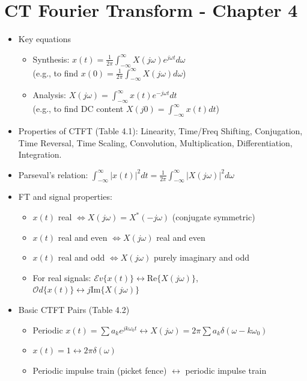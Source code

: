 \documentclass[10pt, twocolumn]{article}
\newcommand{\Ev}{\mathcal{E}v}
\newcommand{\Od}{\mathcal{O}d}
\begin{document}
\section{CT Fourier Transform - Chapter 4}
\begin{itemize}
    \item Key equations
        \begin{itemize}
        \item Synthesis: $x(t) = \frac{1}{2\pi} \int_{-\infty}^{\infty} X(j\omega)e^{j\omega t}d\omega$ \\
        (e.g., to find $x(0) = \frac{1}{2\pi} \int_{-\infty}^{\infty} X(j\omega)d\omega$)
        \item Analysis: $X(j\omega) = \int_{-\infty}^{\infty} x(t)e^{-j\omega t}dt$ \\
        (e.g., to find DC content $X(j0) = \int_{-\infty}^{\infty} x(t)dt$)
        \end{itemize}
    \item Properties of CTFT (Table 4.1): Linearity, Time/Freq Shifting, Conjugation, Time Reversal, Time Scaling, Convolution, Multiplication, Differentiation, Integration.
    \item Parseval's relation: $\int_{-\infty}^{\infty} |x(t)|^2 dt = \frac{1}{2\pi} \int_{-\infty}^{\infty} |X(j\omega)|^2 d\omega$
    \item FT and signal properties:
        \begin{itemize}
        \item $x(t)$ real $\Leftrightarrow X(j\omega) = X^*(-j\omega)$ (conjugate symmetric)
        \item $x(t)$ real and even $\Leftrightarrow X(j\omega)$ real and even
        \item $x(t)$ real and odd $\Leftrightarrow X(j\omega)$ purely imaginary and odd
        \item For real signals: $\Ev\{x(t)\} \leftrightarrow \text{Re}\{X(j\omega)\}$, $\Od\{x(t)\} \leftrightarrow j\text{Im}\{X(j\omega)\}$
        \end{itemize}
    \item Basic CTFT Pairs (Table 4.2)
        \begin{itemize}
        \item Periodic $x(t)=\sum a_k e^{jk\omega_0 t} \leftrightarrow X(j\omega) = 2\pi\sum a_k \delta(\omega-k\omega_0)$
        \item $x(t)=1 \leftrightarrow 2\pi\delta(\omega)$
        \item Periodic impulse train (picket fence) $\leftrightarrow$ periodic impulse train

\end{itemize}
\end{itemize}
\end{document}
